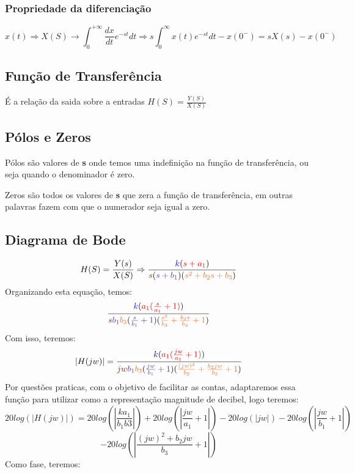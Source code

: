 \documentclass[a4paper, 12pt]{article}
\begin{document}
			\subsubsection{Propriedade da diferenciação}\label{derivada}
			\[
			x(t) \Rightarrow X(S) \rightarrow \int_{0}^{+\infty} \frac{dx}{dt}e^{-st}dt \Rightarrow s\int_{0}^{\infty} x(t)e^{-st}dt - x(0^{-}) = sX(s) - x(0^{-})
			\]
		\subsection{Função de Transferência}
		É a relação da saida sobre a entradas $H(S) = \frac{Y(S)}{X(S)}$			
		\subsection{Pólos e Zeros}\label{zero}
		Pólos são valores de \textbf{s} onde temos uma indefinição na função de transferência, ou seja quando o denominador é zero.

		
		Zeros são todos os valores de \textbf{s} que zera a função de transferência, em outras palavras fazem com que o numerador seja igual a zero.
		\subsection{Diagrama de Bode}\label{bode}
		\[
		H(S) = \frac{Y(s)}{X(S)} \Rightarrow \frac{\textcolor{blue}{k}(\textcolor{red}{s+a_{1}})}{\textcolor{Brown}{s}(\textcolor{Violet}{s+b_{1}})(\textcolor{Orange}{s^{2}+b_{2}s+b_{3}})}
		\]
		Organizando esta equação, temos:
		\[
		 \frac{\textcolor{blue}{k}(\textcolor{red}{a_{1}(\frac{s}{a_{1}}+1)})}{\textcolor{Brown}{s}\textcolor{Violet}{b_{1}}\textcolor{Orange}{b_{3}}(\textcolor{Violet}{\frac{s}{b_{1}}+1})(\textcolor{Orange}{\frac{s^{2}}{b_{3}}+\frac{b_{2}s}{b_{3}}+1})}
		\]		
		Com isso, teremos:
		\[
		|H(jw)| = 		 \frac{\textcolor{blue}{k}(\textcolor{red}{a_{1}(\frac{jw}{a_{1}}+1)})}{\textcolor{Brown}{jw}\textcolor{Violet}{b_{1}}\textcolor{Orange}{b_{3}}(\textcolor{Violet}{\frac{jw}{b_{1}}+1})(\textcolor{Orange}{\frac{(jw)^{2}}{b_{3}}+\frac{b_{2}jw}{b_{3}}+1})}
		\]
		Por questões praticas, com o objetivo de facilitar as contas, adaptaremos essa função para utilizar como a representação magnitude de decibel, logo teremos:\\
		
		\[20log(|H(jw)|) = 20log(|\frac{ka_{1}}{b_{1}b{3}}|) + 20log(|\frac{jw}{a_{1}}+1|) - 20log(|jw|) -20log(|\frac{jw}{b_{1}}+1|) 
		\]
		\[
		- 20log(|\frac{(jw)^{2} + b_{2}jw}{b_{3}}+1|)
		\]
		Como fase, teremos: 
		
\end{document}
